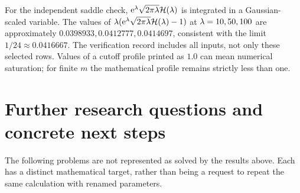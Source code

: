\documentclass[11pt,a4paper]{article}
\numberwithin{equation}{section}
\theoremstyle{definition}
\theoremstyle{remark}
\newcommand{\HH}{\mathcal H}\newcommand{\RR}{\mathcal R}
\begin{document}
For the independent saddle check,
\(\ee^\la\sqrt{2\pi\la}\HH(\la)\) is integrated in a Gaussian-scaled
variable. The values of
\(\la(\ee^\la\sqrt{2\pi\la}\HH(\la)-1)\) at
\(\lambda=10,50,100\) are approximately
\(0.0398933,0.0412777,0.0414697\), consistent with the limit
\(1/24\approx0.0416667\). The verification record includes all inputs,
not only these selected rows. Values of a cutoff profile printed as
\(1.0\) can mean numerical saturation; for finite \(m\) the mathematical
profile remains strictly less than one.

\section{Further research questions and concrete next steps}
\label{sec:future}
The following problems are not represented as solved by the results
above. Each has a distinct mathematical target, rather than being a
request to repeat the same calculation with renamed parameters.
\end{document}
